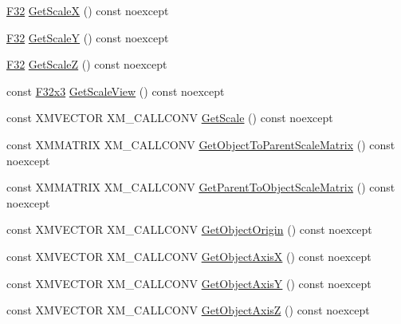 \begin{DoxyCompactItemize}
\item 
\mbox{\hyperlink{namespacemage_aa97e833b45f06d60a0a9c4fc22ae02c0}{F32}} \mbox{\hyperlink{classmage_1_1_s_q_t_transform3_d_afe7bd85c03cc9426b183841017df6d1c}{Get\+ScaleX}} () const noexcept
\item 
\mbox{\hyperlink{namespacemage_aa97e833b45f06d60a0a9c4fc22ae02c0}{F32}} \mbox{\hyperlink{classmage_1_1_s_q_t_transform3_d_aaeb2da871b6bbff96c142333d3997cfa}{Get\+ScaleY}} () const noexcept
\item 
\mbox{\hyperlink{namespacemage_aa97e833b45f06d60a0a9c4fc22ae02c0}{F32}} \mbox{\hyperlink{classmage_1_1_s_q_t_transform3_d_a1466fc2eb41783e6693bfe5c3545c06e}{Get\+ScaleZ}} () const noexcept
\item 
const \mbox{\hyperlink{namespacemage_a1e3c7a882af461f161caa1cbddaf1fa2}{F32x3}} \mbox{\hyperlink{classmage_1_1_s_q_t_transform3_d_a9663b15b53a2e0ea4629f95e2e664d99}{Get\+Scale\+View}} () const noexcept
\item 
const X\+M\+V\+E\+C\+T\+OR X\+M\+\_\+\+C\+A\+L\+L\+C\+O\+NV \mbox{\hyperlink{classmage_1_1_s_q_t_transform3_d_a696f2629bbf7ae9f53149b060b8667f7}{Get\+Scale}} () const noexcept
\item 
const X\+M\+M\+A\+T\+R\+IX X\+M\+\_\+\+C\+A\+L\+L\+C\+O\+NV \mbox{\hyperlink{classmage_1_1_s_q_t_transform3_d_a64ad3a88479badb2d94638705f75515f}{Get\+Object\+To\+Parent\+Scale\+Matrix}} () const noexcept
\item 
const X\+M\+M\+A\+T\+R\+IX X\+M\+\_\+\+C\+A\+L\+L\+C\+O\+NV \mbox{\hyperlink{classmage_1_1_s_q_t_transform3_d_ad0da8593cfc43f42f9369d1f5c99cf5e}{Get\+Parent\+To\+Object\+Scale\+Matrix}} () const noexcept
\item 
const X\+M\+V\+E\+C\+T\+OR X\+M\+\_\+\+C\+A\+L\+L\+C\+O\+NV \mbox{\hyperlink{classmage_1_1_s_q_t_transform3_d_aa289678aeaf11a182e89ce4eccf38b21}{Get\+Object\+Origin}} () const noexcept
\item 
const X\+M\+V\+E\+C\+T\+OR X\+M\+\_\+\+C\+A\+L\+L\+C\+O\+NV \mbox{\hyperlink{classmage_1_1_s_q_t_transform3_d_a654bdb773dc082a56bda467ac8baedd5}{Get\+Object\+AxisX}} () const noexcept
\item 
const X\+M\+V\+E\+C\+T\+OR X\+M\+\_\+\+C\+A\+L\+L\+C\+O\+NV \mbox{\hyperlink{classmage_1_1_s_q_t_transform3_d_aca6a1da4ac8033de379d3932baad7020}{Get\+Object\+AxisY}} () const noexcept
\item 
const X\+M\+V\+E\+C\+T\+OR X\+M\+\_\+\+C\+A\+L\+L\+C\+O\+NV \mbox{\hyperlink{classmage_1_1_s_q_t_transform3_d_a1869c1d838df41dc6a7cf07b72dd9100}{Get\+Object\+AxisZ}} () const noexcept

\end{DoxyCompactItemize}

